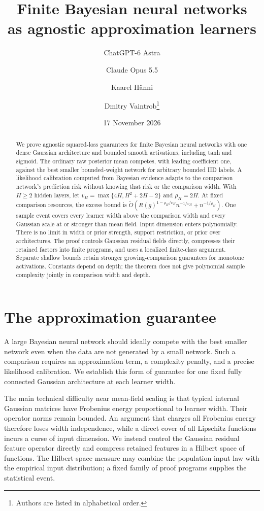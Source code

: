 \documentclass[11pt]{article}
\title{Finite Bayesian neural networks\\as agnostic approximation learners}
\author{ChatGPT-6 Astra \and Claude Opus 5.5 \and Kaarel H\"anni \and Dmitry Vaintrob\thanks{Authors are listed in alphabetical order.}}
\date{17 November 2026}
\theoremstyle{remark}\newtheorem{remark}[theorem]{Remark}
\begin{document}
\maketitle
\begin{abstract}
We prove agnostic squared-loss guarantees for finite Bayesian neural networks with one dense Gaussian architecture and bounded smooth activations, including tanh and sigmoid. The ordinary raw posterior mean competes, with leading coefficient one, against the best smaller bounded-weight network for arbitrary bounded IID labels. A likelihood calibration computed from Bayesian evidence adapts to the comparison network's prediction risk without knowing that risk or the comparison width. With $H\ge2$ hidden layers, let $v_H=\max\{4H,H^2+2H-2\}$ and $\rho_H=2H$. At fixed comparison resources, the excess bound is $\widetilde O(R(g)^{1-\rho_H/v_H}n^{-1/v_H}+n^{-1/\rho_H})$. One sample event covers every learner width above the comparison width and every Gaussian scale at or stronger than mean field. Input dimension enters polynomially. There is no limit in width or prior strength, support restriction, or prior over architectures. The proof controls Gaussian residual fields directly, compresses their retained factors into finite programs, and uses a localized finite-class argument. Separate shallow bounds retain stronger growing-comparison guarantees for monotone activations. Constants depend on depth; the theorem does not give polynomial sample complexity jointly in comparison width and depth.
\end{abstract}

\section{The approximation guarantee}
A large Bayesian neural network should ideally compete with the best smaller network even when the data are not generated by a small network. Such a comparison requires an approximation term, a complexity penalty, and a precise likelihood calibration. We establish this form of guarantee for one fixed fully connected Gaussian architecture at each learner width.

The main technical difficulty near mean-field scaling is that typical internal Gaussian matrices have Frobenius energy proportional to learner width. Their operator norms remain bounded. An argument that charges all Frobenius energy therefore loses width independence, while a direct cover of all Lipschitz functions incurs a curse of input dimension. We instead control the Gaussian residual feature operator directly and compress retained features in a Hilbert space of functions. The Hilbert-space measure may combine the population input law with the empirical input distribution; a fixed family of proof programs supplies the statistical event.
\end{document}
